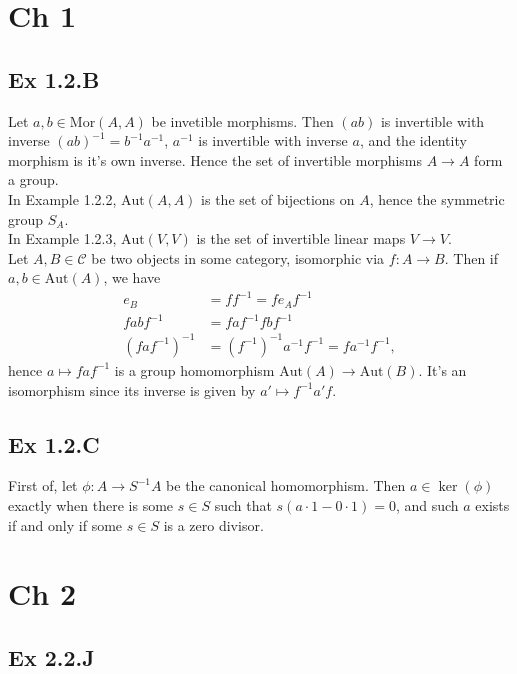 \documentclass{article}
\theoremstyle{definition}
\newcommand{\Aut}{\text{Aut}}
\newcommand{\Mor}{\text{Mor}}
\begin{document}
\section*{Ch 1}

\subsection*{Ex 1.2.B}
Let $a, b \in \Mor(A, A)$ be invetible morphisms. Then $(ab)$ is invertible
with inverse $(ab)^{-1} = b^{-1}a^{-1}$, $a^{-1}$ is invertible with inverse
$a$, and the identity morphism is it's own inverse. Hence the set of invertible
morphisms $A \to A$ form a group. \\

In Example 1.2.2, $\Aut(A, A)$ is the set of bijections on $A$, hence the
symmetric group $S_A$. \\

In Example 1.2.3, $\Aut(V, V)$ is the set of invertible linear maps $V \to V$. \\

Let $A, B \in \mathcal{C}$ be two objects in some category, isomorphic via $f :
A \to B$. Then if $a, b \in \Aut(A)$, we have
\begin{align*}
	e_B &= f f^{-1} = f e_A f^{-1} \\
	f a b f^{-1} &= f a f^{-1} f b f^{-1} \\
	(f a f^{-1})^{-1} &= (f^{-1})^{-1} a^{-1} f^{-1} = f a^{-1} f^{-1},
\end{align*}
hence $a \mapsto f a f^{-1}$ is a group homomorphism $\Aut(A) \to \Aut(B)$.
It's an isomorphism since its inverse is given by $a' \mapsto f^{-1} a' f$.

\subsection*{Ex 1.2.C}

First of, let $\phi : A \to S^{-1}A$ be the canonical homomorphism. Then $a \in
\ker(\phi)$ exactly when there is some $s \in S$ such that $s(a \cdot 1 - 0
\cdot 1) = 0$, and such $a$ exists if and only if some $s \in S$ is a zero
divisor.

\section*{Ch 2}

\subsection*{Ex 2.2.J}
\end{document}
